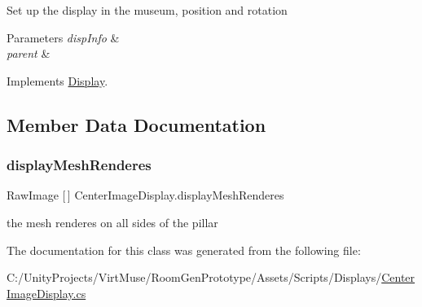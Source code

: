 Set up the display in the museum, position and rotation 


\begin{DoxyParams}{Parameters}
{\em disp\+Info} & \\
\hline
{\em parent} & \\
\hline
\end{DoxyParams}


Implements \mbox{\hyperlink{class_display_a57325251fbeac943cd48520e50f0bec4}{Display}}.



\subsection{Member Data Documentation}
\mbox{\label{class_center_image_display_afd5ccf58dcdcddc7592026ee840cf55d}} 
\subsubsection{\texorpdfstring{display\+Mesh\+Renderes}{displayMeshRenderes}}
{\footnotesize\ttfamily Raw\+Image \mbox{[}$\,$\mbox{]} Center\+Image\+Display.\+display\+Mesh\+Renderes}



the mesh renderes on all sides of the pillar 



The documentation for this class was generated from the following file\+:\begin{DoxyCompactItemize}
\item 
C\+:/\+Unity\+Projects/\+Virt\+Muse/\+Room\+Gen\+Prototype/\+Assets/\+Scripts/\+Displays/\mbox{\hyperlink{_center_image_display_8cs}{Center\+Image\+Display.\+cs}}\end{DoxyCompactItemize}
